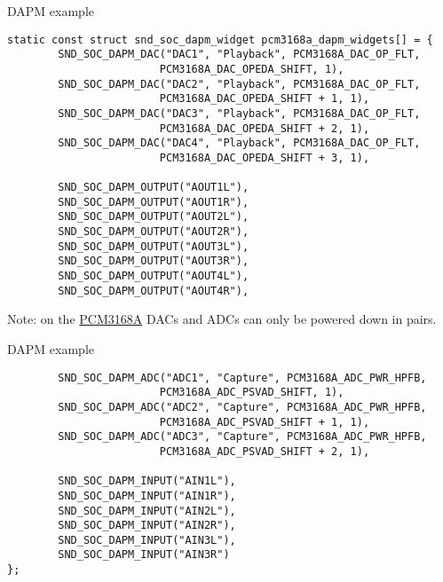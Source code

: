 \begin{frame}[fragile]{DAPM example}
  \begin{block}{}
    \fontsize{8}{7}\selectfont
    \begin{verbatim}
static const struct snd_soc_dapm_widget pcm3168a_dapm_widgets[] = {
        SND_SOC_DAPM_DAC("DAC1", "Playback", PCM3168A_DAC_OP_FLT,
                        PCM3168A_DAC_OPEDA_SHIFT, 1),
        SND_SOC_DAPM_DAC("DAC2", "Playback", PCM3168A_DAC_OP_FLT,
                        PCM3168A_DAC_OPEDA_SHIFT + 1, 1),
        SND_SOC_DAPM_DAC("DAC3", "Playback", PCM3168A_DAC_OP_FLT,
                        PCM3168A_DAC_OPEDA_SHIFT + 2, 1),
        SND_SOC_DAPM_DAC("DAC4", "Playback", PCM3168A_DAC_OP_FLT,
                        PCM3168A_DAC_OPEDA_SHIFT + 3, 1),

        SND_SOC_DAPM_OUTPUT("AOUT1L"),
        SND_SOC_DAPM_OUTPUT("AOUT1R"),
        SND_SOC_DAPM_OUTPUT("AOUT2L"),
        SND_SOC_DAPM_OUTPUT("AOUT2R"),
        SND_SOC_DAPM_OUTPUT("AOUT3L"),
        SND_SOC_DAPM_OUTPUT("AOUT3R"),
        SND_SOC_DAPM_OUTPUT("AOUT4L"),
        SND_SOC_DAPM_OUTPUT("AOUT4R"),
    \end{verbatim}
  \end{block}
  Note: on the \href{https://www.ti.com/lit/gpn/pcm3168a}{PCM3168A} DACs
  and ADCs can only be powered down in pairs.
\end{frame}

\begin{frame}[fragile]{DAPM example}
  \begin{block}{}
    \fontsize{8}{7}\selectfont
    \begin{verbatim}
        SND_SOC_DAPM_ADC("ADC1", "Capture", PCM3168A_ADC_PWR_HPFB,
                        PCM3168A_ADC_PSVAD_SHIFT, 1),
        SND_SOC_DAPM_ADC("ADC2", "Capture", PCM3168A_ADC_PWR_HPFB,
                        PCM3168A_ADC_PSVAD_SHIFT + 1, 1),
        SND_SOC_DAPM_ADC("ADC3", "Capture", PCM3168A_ADC_PWR_HPFB,
                        PCM3168A_ADC_PSVAD_SHIFT + 2, 1),

        SND_SOC_DAPM_INPUT("AIN1L"),
        SND_SOC_DAPM_INPUT("AIN1R"),
        SND_SOC_DAPM_INPUT("AIN2L"),
        SND_SOC_DAPM_INPUT("AIN2R"),
        SND_SOC_DAPM_INPUT("AIN3L"),
        SND_SOC_DAPM_INPUT("AIN3R")
};
    \end{verbatim}
  \end{block}
\end{frame}

